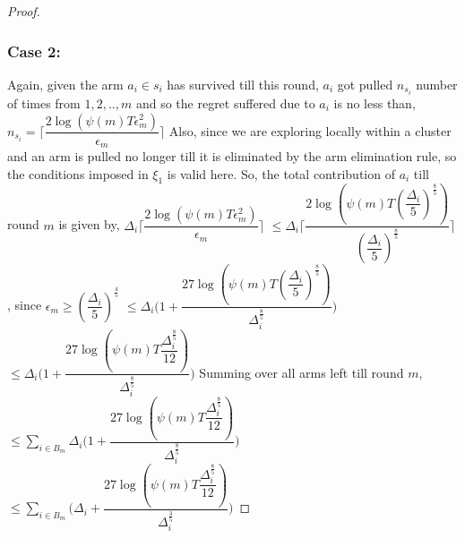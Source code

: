 \begin{proof}
\subsubsection{Case 2:}
Again, given the arm $a_{i}\in s_{i}$ has survived till this round, $a_{i}$ got pulled $n_{s_{i}}$ number of times from $1,2,..,m$ and so the regret suffered due to $a_{i}$ is no less than,
\newline
\hspace*{4em}$n_{s_{i}}=\bigg\lceil\dfrac{2\log{(\psi(m)T\epsilon_{m}^{2})}}{\epsilon_{m}}\bigg\rceil$
\newline
Also, since we are exploring locally within a cluster and an arm is pulled no longer till it is eliminated by the arm elimination rule, so the conditions imposed in $\xi_{1}$ is valid here.
So, the total contribution of $a_{i}$  till round $m$ is given by,
\newline
\hspace*{4em}$\Delta_{i}\bigg\lceil\dfrac{2\log{(\psi(m)T\epsilon_{m}^{2})}}{\epsilon_{m}}\bigg\rceil$
$\leq\Delta_{i}\bigg\lceil\dfrac{2\log{(\psi(m)T(\dfrac{\Delta_{i}}{5})^{\frac{8}{5}})}}{(\dfrac{\Delta_{i}}{5})^{\frac{8}{5}}}\bigg\rceil$, since $\epsilon_{m}\geq(\dfrac{\Delta_{i}}{5})^{\frac{4}{5}}$
\newline
\hspace*{14em}
$\leq\Delta_{i}\bigg(1+\dfrac{27\log{(\psi(m)T(\dfrac{\Delta_{i}}{5})^{\frac{8}{5}})}}{\Delta_{i}^{\frac{8}{5}}}\bigg)$
\newline
\hspace*{14em}
$\leq\Delta_{i}\bigg(1+\dfrac{27\log{(\psi(m)T\dfrac{\Delta_{i}^{\frac{8}{5}}}{12})}}{\Delta_{i}^{\frac{8}{5}}}\bigg)$
\newline
Summing over all arms left till round $m$,
\newline
\hspace*{4em}$\leq\sum_{i\in B_{m}}\Delta_{i}\bigg(1+\dfrac{27\log{(\psi(m)T\dfrac{\Delta_{i}^{\frac{8}{5}}}{12})}}{\Delta_{i}^{\frac{8}{5}}}\bigg)$
\newline
\hspace*{4em}$\leq\sum_{i\in B_{m}}\bigg(\Delta_{i}+\dfrac{27\log{(\psi(m)T\dfrac{\Delta_{i}^{\frac{8}{5}}}{12})}}{\Delta_{i}^{\frac{3}{5}}}\bigg)$

\end{proof}
